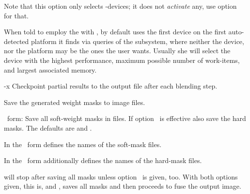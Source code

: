 \begin{codelist}
  Note that this option only selects -devices; it does not \emph{activate} any, use
  option~ for that.

  When told to employ the  with , by default \App{} uses the first
  device on the first auto-detected platform it finds via queries of the 
  subsystem, where neither the device, nor the platform may be the ones the user wants.  Usually
  she will select the device with the highest performance, maximum possible number of
  work-items, and largest associated memory.


\ifenblend
    \label{opt:x}%
  \item[-x]
    Checkpoint partial results to the output file after each blending step.
\fi


\ifenfuse
    \label{opt:save-masks}%
  \item[\itempar{--save-masks~\textrm{(\oldstylefirst~form)}
      \\ --save-masks=\metavar{SOFT-MASK-TEMPLATE}~\textrm{(\oldstylesecond~form)}
      \\ --save-masks=\metavar{SOFT-MASK-TEMPLATE}:\feasiblebreak
      \metavar{HARD-MASK-TEMPLATE}~\textrm{(\oldstylethird~form)}}]\itemend
    Save the generated weight masks to image files.

    \begin{sloppypar}
      \oldstylefirst~form: Save all soft-weight masks in files.  If
      option~ is effective also save the hard
      masks.  The defaults are  and
      .

      In the \oldstylesecond~form  defines the names of
      the soft-mask files.

      In the \oldstylethird~form  additionally defines the
      names of the hard-mask files.
    \end{sloppypar}

    \App{} will stop after saving all masks unless
    option~ is given, too.  With both options given,
    this is,  and , \App{} saves all masks and then
    proceeds to fuse the output image.


\end{codelist}
